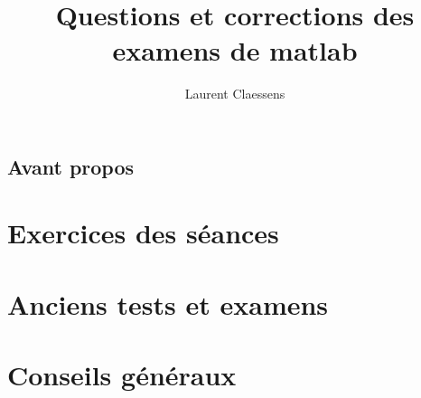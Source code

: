 





\title{Questions et corrections des examens de matlab}
\author{Laurent Claessens}
\maketitle

\section*{Avant propos}

\tableofcontents

\chapter{Exercices des séances}


\chapter{Anciens tests et examens}



\chapter{Conseils généraux}



